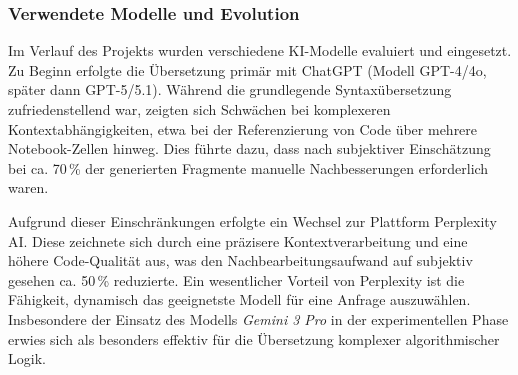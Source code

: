 \subsubsection{Verwendete Modelle und Evolution}
Im Verlauf des Projekts wurden verschiedene KI-Modelle evaluiert und eingesetzt. Zu Beginn erfolgte die Übersetzung primär mit ChatGPT (Modell GPT-4/4o, später dann GPT-5/5.1). Während die grundlegende Syntaxübersetzung zufriedenstellend war, zeigten sich Schwächen bei komplexeren Kontextabhängigkeiten, etwa bei der Referenzierung von Code über mehrere Notebook-Zellen hinweg. Dies führte dazu, dass nach subjektiver Einschätzung bei ca. 70\,\% der generierten Fragmente manuelle Nachbesserungen erforderlich waren.

Aufgrund dieser Einschränkungen erfolgte ein Wechsel zur Plattform Perplexity AI. Diese zeichnete sich durch eine präzisere Kontextverarbeitung und eine höhere Code-Qualität aus, was den Nachbearbeitungsaufwand auf subjektiv gesehen ca. 50\,\% reduzierte. Ein wesentlicher Vorteil von Perplexity ist die Fähigkeit, dynamisch das geeignetste Modell für eine Anfrage auszuwählen. Insbesondere der Einsatz des Modells \textit{Gemini 3 Pro} in der experimentellen Phase erwies sich als besonders effektiv für die Übersetzung komplexer algorithmischer Logik.

